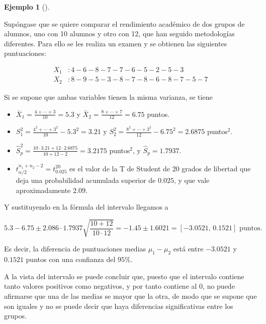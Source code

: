 \documentclass[
  spanish,
  a4paper,
]{scrreport}
\providecommand{\tightlist}{%
  \setlength{\itemsep}{0pt}\setlength{\parskip}{0pt}}
\theoremstyle{plain}
\theoremstyle{definition}
\newtheorem{example}{Ejemplo}[chapter]
\theoremstyle{definition}
\theoremstyle{remark}
\begin{document}
\begin{example}[]\protect\hypertarget{exm-intervalo-confianza-diferencia-medias-normales-varianzas-desconocidas-iguales}{}\label{exm-intervalo-confianza-diferencia-medias-normales-varianzas-desconocidas-iguales}

Supóngase que se quiere comparar el rendimiento académico de dos grupos
de alumnos, uno con 10 alumnos y otro con 12, que han seguido
metodologías diferentes. Para ello se les realiza un examen y se
obtienen las siguientes puntuaciones:

\begin{align*}
X_1 &: 4 - 6 - 8 - 7 - 7 - 6 - 5 - 2 - 5 - 3 \\
X_2 &: 8 - 9 - 5 - 3 - 8 - 7 - 8 - 6 - 8 - 7 - 5 - 7
\end{align*}

Si se supone que ambas variables tienen la misma varianza, se tiene

\begin{itemize}
\tightlist
\item
  \(\bar{X}_1 = \frac{4+\cdots +3}{10}=5.3\) y
  \(\bar{X}_2=\frac{8+\cdots +7}{12}=6.75\) puntos.
\item
  \(S_1^2= \frac{4^2+\cdots + 3^2}{10}-5.3^2=3.21\) y
  \(S_2^2= \frac{8^2+\cdots
  +3^2}{12}-6.75^2=2.6875\) puntos\(^2\).
\item
  \(\hat{S}_p^2 = \frac{10\cdot 3.21+12\cdot 2.6875}{10+12-2}= 3.2175\)
  puntos\(^2\), y \(\hat S_p=1.7937\).
\item
  \(t^{n_1+n_2-2}_{\alpha/2}=t^{20}_{0.025}\) es el valor de la T de
  Student de 20 grados de libertad que deja una probabilidad acumulada
  superior de \(0.025\), y que vale aproximadamente \(2.09\).
\end{itemize}

\end{example}

Y sustituyendo en la fórmula del intervalo llegamos a

\[
5.3-6.75 \pm 2.086\cdot 1.7937\sqrt{\frac{10+12}{10\cdot 12}} = -1.45\pm 1.6021 = [-3.0521,\,0.1521] \text{ puntos}.
\]

Es decir, la diferencia de puntuaciones medias \(\mu_1-\mu_2\) está
entre \(-3.0521\) y \(0.1521\) puntos con una confianza del \(95\%\).

A la vista del intervalo se puede concluir que, puesto que el intervalo
contiene tanto valores positivos como negativos, y por tanto contiene al
0, no puede afirmarse que una de las medias se mayor que la otra, de
modo que se supone que son iguales y no se puede decir que haya
diferencias significativas entre los grupos.
\end{document}

